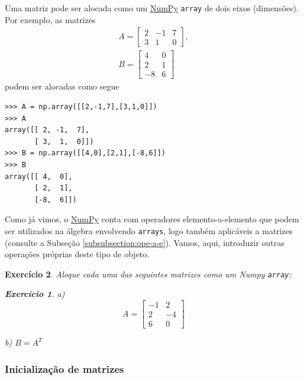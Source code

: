 \documentclass[12pt]{article}
\newtheorem{exr}{Exercício}[section]
\begin{document}
Uma matriz pode ser alocada como um \href{https://numpy.org/}{NumPy} \lstinline+array+ de dois eixos (dimensões). Por exemplo, as matrizes
\begin{gather}
  A =
  \begin{bmatrix}
    2 & -1 & 7\\
    3 & 1 & 0
  \end{bmatrix},\\
  B =
  \begin{bmatrix}
    4 & 0\\
    2 & 1\\
   -8 & 6
  \end{bmatrix}
\end{gather}
podem ser alocadas como segue
\begin{lstlisting}
>>> A = np.array([[2,-1,7],[3,1,0]])
>>> A
array([[ 2, -1,  7],
       [ 3,  1,  0]])
>>> B = np.array([[4,0],[2,1],[-8,6]])
>>> B
array([[ 4,  0],
       [ 2,  1],
       [-8,  6]])
\end{lstlisting}


Como já vimos, o \href{https://numpy.org/}{NumPy} conta com operadores elemento-a-elemento que podem ser utilizados na álgebra envolvendo \lstinline+arrays+, logo também aplicáveis a matrizes (consulte a Subseção \ref{subsubsection:ope-a-e}). Vamos, aqui, introduzir outras operações próprias deste tipo de objeto.

\begin{exr}
  Aloque cada uma das seguintes matrizes como um Numpy \lstinline+array+:
  \begin{exr}
  \item[a)]
    \begin{equation}
      A =
      \begin{bmatrix}
        -1 & 2\\
        2 & -4\\
        6 & 0
      \end{bmatrix}
    \end{equation}
  \item[b)] $B = A^T$ 
  \end{exr}
\end{exr}

\subsubsection{Inicialização de matrizes}
\end{document}
